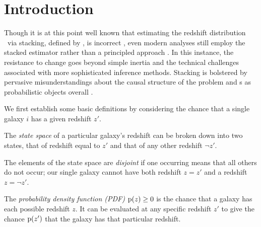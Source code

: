 \section{Introduction}

Though it is at this point well known that estimating the redshift distribution \Nz\ via stacking, defined by , is incorrect \citep{leistedt_hierarchical_2016, malz_chippr_nodate}, even modern analyses still employ the stacked estimator rather than a principled approach \citep{hoyle_dark_2017}.
In this instance, the resistance to change goes beyond simple inertia and the technical challenges associated with more sophisticated inference methods.
Stacking is bolstered by pervasive misunderstandings about the causal structure of the problem and \pzpdf s as probabilistic objects overall \citep{jarvis_rmjarvis_nodate, malz_aimalz_nodate}.


We first establish some basic definitions by considering the chance that a single galaxy $i$ has a given redshift $z'$.

\begin{definition}\label{def:binarystatespace}
	The \textit{state space} of a particular galaxy's redshift can be broken down into two states, that of redshift equal to $z'$ and that of any other redshift $\lnot z'$.
\end{definition}

\begin{definition}\label{def:disjoint}
	The elements of the state space are \textit{disjoint} if one occurring means that all others do not occur; our single galaxy cannot have both redshift $z = z'$ and a redshift $z = \lnot z'$.
\end{definition}

\begin{definition}\label{def:pdens}
	The \textit{probability density function (PDF)} $\mathrm{p}(z) \geq 0$ is the chance that a galaxy has each possible redshift $z$.
	It can be evaluated at any specific redshift $z'$ to give the chance $\mathrm{p}(z')$ that the galaxy has that particular redshift.
\end{definition}

